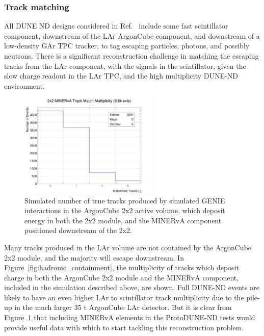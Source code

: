 \subsubsection{Track matching}
All DUNE ND designs considered in Ref.~\cite{dune_ndcsg} include some fast scintillator component, downstream of the LAr ArgonCube component, and downstream of a low-density GAr TPC tracker, to tag escaping particles, photons, and possibly neutrons. There is a significant reconstruction challenge in matching the escaping tracks from the LAr component, with the signals in the scintillator, given the slow charge readout in the LAr TPC, and the high multiplicity DUNE-ND environment.

\begin{figure}[htb]
  \centering
  \includegraphics[width=0.6\textwidth]{plots/2x2_minerva_plots/track_mathch_multiplicity.png}
  \caption{Simulated number of true tracks produced by simulated GENIE interactions in the ArgonCube 2x2 active volume, which deposit energy in both the 2x2 module, and the MINERvA component positioned downstream of the 2x2.}
  \label{fig:track_multiplicity_min}
\end{figure}
Many tracks produced in the LAr volume are not contained by the ArgonCube 2x2 module, and the majority will escape downstream. In Figure~\ref{fig:hadronic_containment}, the multiplicity of tracks which deposit charge in both the ArgonCube 2x2 module and the MINERvA component, included in the simulation described above, are shown. Full DUNE-ND events are likely to have an even higher LAr to scintillator track multiplicity due to the pile-up in the much larger 35 t ArgonCube LAr detector. But it is clear from Figure~\ref{fig:track_multiplicity_min} that including MINERvA elements in the ProtoDUNE-ND tests would provide useful data with which to start tackling this reconstruction problem.

